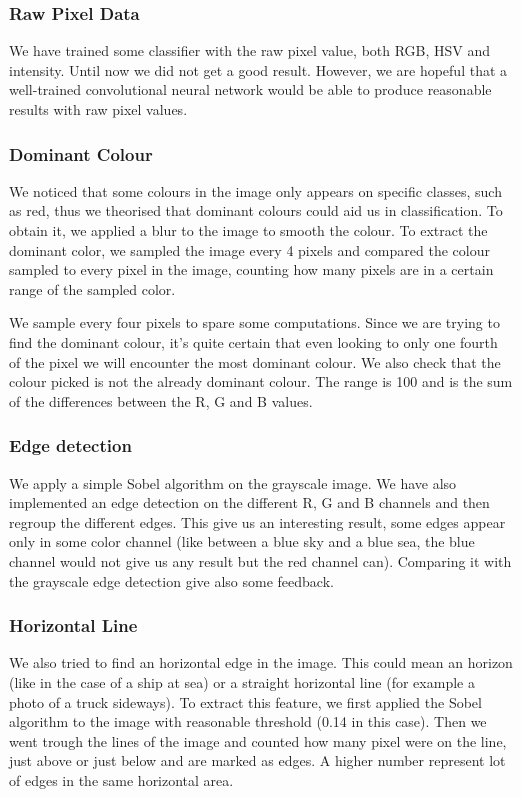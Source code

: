 \documentclass{article} %
\begin{document}
\subsubsection{Raw Pixel Data}
We have trained some classifier with the raw pixel value, both RGB, HSV and intensity. Until now we did not get a good result. However, we are hopeful that a well-trained convolutional neural network would be able to produce reasonable results with raw pixel values.

\subsubsection{Dominant Colour}
We noticed that some colours in the image only appears on specific classes, such as red, thus we theorised that dominant colours could aid us in classification. To obtain it, we applied a blur to the image to smooth the colour. To extract the dominant color, we sampled the image every 4 pixels and compared the colour sampled to every pixel in the image, counting how many pixels are in a certain range of the sampled color.

We sample every four pixels to spare some computations. Since we are trying to find the dominant colour, it's quite certain that even looking to only one fourth of the pixel we will encounter the most dominant colour. We also check that the colour picked is not the already dominant colour. The range is 100 and is the sum of the differences between the R, G and B values. 

\subsubsection{Edge detection}
We apply a simple Sobel algorithm on the grayscale image. We have also implemented an edge detection on the different R, G and B channels and then regroup the different edges. This give us an interesting result, some edges appear only in some color channel (like between a blue sky and a blue sea, the blue channel would not give us any result but the red channel can). Comparing it with the grayscale edge detection give also some feedback.

\subsubsection{Horizontal Line}

We also tried to find an horizontal edge in the image. This could mean an horizon (like in the case of a ship at sea) or a straight horizontal line (for example a photo of a truck sideways). To extract this feature, we first applied the Sobel algorithm to the image with reasonable threshold (0.14 in this case). Then we went trough the lines of the image and counted how many pixel were on the line, just above or just below and are marked as edges. A higher number represent lot of edges in the same horizontal area. 
\end{document}
